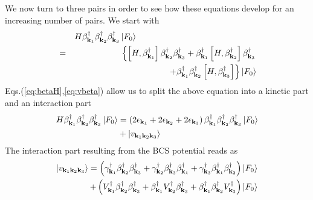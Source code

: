 \documentclass[aps,prb,superscriptaddress,showpacs,reprint,lengthcheck]{revtex4-1}
\begin{document}
We now turn to three pairs in order to see how these equations develop for an
increasing number of pairs. We start with 
\begin{eqnarray}  \label{eq:SchThree}
&&H\beta^{\dagger}_{\mathbf{k} _1}\beta^{\dagger}_{\mathbf{k}
_2}\beta^{\dagger}_{\mathbf{k} _3}\left|F_0\right>  \hspace{5cm}
\nonumber\\
&=&\left\{\left[H,\beta^{\dagger}_{\mathbf{k} _1}\right]  \beta^{\dagger}_{%
\mathbf{k} _2}\beta^{\dagger}_{\mathbf{k} _3}+\beta^{\dagger}_{\mathbf{k} _1}%
\left[H,\beta^{\dagger}_{\mathbf{k} _2}\right]  \beta^{\dagger}_{\mathbf{k}
_3}\right.
\nonumber\\ &&\left.
+\beta^{\dagger}_{\mathbf{k} _1}\beta^{\dagger}_{\mathbf{k} _2}\left[%
H,\beta^{\dagger}_{\mathbf{k} _3}\right]  \right\}
\left|F_0\right> 
\end{eqnarray}%
 Eqs.(\ref{eq:betaH},\ref{eq:vbeta})  allow us to split the above equation into a kinetic part and an interaction part
\begin{equation}  \label{eq:SchThree2}
\begin{split}
H\beta^{\dagger}_{\mathbf{k} _1}\beta^{\dagger}_{\mathbf{k}
_2}\beta^{\dagger}_{\mathbf{k} _3}\left|F_0\right>   &=\left(2\epsilon_{%
\mathbf{k} _1}+2\epsilon_{\mathbf{k} _2}+2\epsilon_{\mathbf{k} _3}\right)
\beta^{\dagger}_{\mathbf{k} _1}\beta^{\dagger}_{\mathbf{k}
_2}\beta^{\dagger}_{\mathbf{k} _3}\left|F_0\right>   \\
&+\left|v_{\mathbf{k} _1\mathbf{k} _2\mathbf{k} _3}\right> 
\end{split}%
\end{equation}
The interaction part resulting from the BCS potential reads as 
\begin{equation}  \label{eq:vThree}
\begin{split}
\left|v_{\mathbf{k} _1\mathbf{k} _2\mathbf{k} _3}\right> =
\left(\gamma^{\dagger}_{\mathbf{k} _1}\beta^{\dagger}_{\mathbf{k}
_2}\beta^{\dagger}_{\mathbf{k} _3}+\gamma^{\dagger}_{\mathbf{k}
_2}\beta^{\dagger}_{\mathbf{k} _3}\beta^{\dagger}_{\mathbf{k}
_1}+\gamma^{\dagger}_{\mathbf{k} _3}\beta^{\dagger}_{\mathbf{k}
_1}\beta^{\dagger}_{\mathbf{k} _2}\right) \left|F_0\right>   \\
+\left(V^{\dagger}_{\mathbf{k} _1}\beta^{\dagger}_{\mathbf{k}
_2}\beta^{\dagger}_{\mathbf{k} _3}+\beta^{\dagger}_{\mathbf{k}
_1}V^{\dagger}_{\mathbf{k} _2}\beta^{\dagger}_{\mathbf{k} _3}+\beta^{%
\dagger}_{\mathbf{k} _1}\beta^{\dagger}_{\mathbf{k} _2}V^{\dagger}_{\mathbf{k%
} _3}\right) \left|F_0\right>  
\end{split}%
\end{equation}
\end{document}
